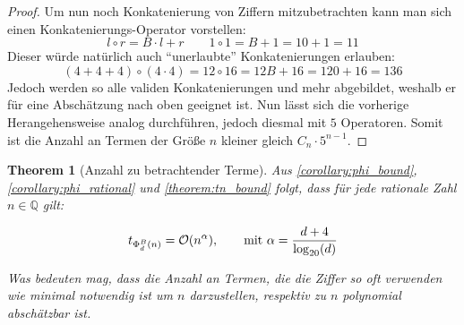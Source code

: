 \documentclass{article}
\newtheorem{theorem}{Theorem}[section]
\theoremstyle{nonumberplain}
\newtheorem{proof}{Beweis}
\begin{document}
\begin{proof}
    Um nun noch Konkatenierung von Ziffern mitzubetrachten kann man sich einen Konkatenierungs-Operator vorstellen:
    \[l \circ r = B \cdot l + r \quad\quad 1\circ1 = B + 1 = 10 + 1 = 11\]
    Dieser würde natürlich auch ``unerlaubte'' Konkatenierungen erlauben:
    \[(4+4+4) \circ (4\cdot4) = 12 \circ 16 = 12B + 16 = 120 + 16 = 136\]
    Jedoch werden so alle validen Konkatenierungen und mehr abgebildet, weshalb er für eine Abschätzung nach oben geeignet ist.
    Nun lässt sich die vorherige Herangehensweise analog durchführen, jedoch diesmal mit \(5\) Operatoren.
    Somit ist die Anzahl an Termen der Größe \(n\) kleiner gleich \(C_n \cdot 5^{n-1}\).
\end{proof}

\begin{theorem}[Anzahl zu betrachtender Terme]\label{theorem:tn_of_phi}
    Aus \ref{corollary:phi_bound}, \ref{corollary:phi_rational} und \ref{theorem:tn_bound} folgt, dass für jede rationale Zahl \(n\in\mathbb{Q}\) gilt:

        \[t_{\Phi_{d}^{B}(n)} = \mathcal{O}(n^{\alpha}),\qquad\text{mit }\alpha=\frac{d+4}{\log_{20}(d)}\]

    Was bedeuten mag, dass die Anzahl an Termen, die die Ziffer so oft verwenden wie minimal notwendig ist um \(n\) darzustellen, respektiv zu \(n\) polynomial abschätzbar ist.
\end{theorem}

\end{document}
